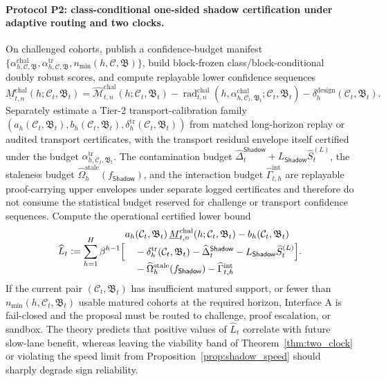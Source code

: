 \documentclass[11pt]{article}
\theoremstyle{definition}
\newcommand{\1}{\mathbf{1}}
\newcommand{\Defeq}{\vcentcolon=}
\newcommand{\Shadow}{\mathsf{Shadow}}
\begin{document}
\paragraph{Protocol P2: class-conditional one-sided shadow certification under adaptive routing and two clocks.} On challenged cohorts, publish a confidence-budget manifest $\{\alpha_{h,\mathcal C,\mathfrak B}^{\mathrm{chal}},\alpha_{h,\mathcal C,\mathfrak B}^{\mathrm{tr}},n_{\min}(h,\mathcal C,\mathfrak B)\}$, build block-frozen class/block-conditional doubly robust scores, and compute replayable lower confidence sequences
\[
\underline M^{\mathrm{chal}}_{t,n}(h;\mathcal C_t,\mathfrak B_t)
=
\widehat{\mathcal M}_{t,n}^{\mathrm{chal}}(h;\mathcal C_t,\mathfrak B_t)
-\operatorname{rad}_{t,n}^{\mathrm{chal}}(h,\alpha_{h,\mathcal C_t,\mathfrak B_t}^{\mathrm{chal}};\mathcal C_t,\mathfrak B_t)
-\delta_h^{\mathrm{design}}(\mathcal C_t,\mathfrak B_t).
\]
Separately estimate a Tier-2 transport-calibration family $(a_h(\mathcal C_t,\mathfrak B_t),b_h(\mathcal C_t,\mathfrak B_t),\delta_h^{\mathrm{tr}}(\mathcal C_t,\mathfrak B_t))$ from matched long-horizon replay or audited transport certificates, with the transport residual envelope itself certified under the budget $\alpha_{h,\mathcal C_t,\mathfrak B_t}^{\mathrm{tr}}$. The contamination budget $\widehat\Delta_t^{\Shadow}+L_{\Shadow}\widehat S_t^{(L)}$, the staleness budget $\widehat\Omega_h^{\mathrm{stale}}(f_{\Shadow})$, and the interaction budget $\widehat\Gamma_{t,h}^{\mathrm{int}}$ are replayable proof-carrying upper envelopes under separate logged certificates and therefore do not consume the statistical budget reserved for challenge or transport confidence sequences. Compute the operational certified lower bound
\[
\widehat L_t
\Defeq
\sum_{h=1}^{H}\beta^{h-1}\Bigl[
\begin{aligned}
& a_h(\mathcal C_t,\mathfrak B_t)\,\underline M^{\mathrm{chal}}_{t,n}(h;\mathcal C_t,\mathfrak B_t)
-b_h(\mathcal C_t,\mathfrak B_t)\\
&\quad -\delta_h^{\mathrm{tr}}(\mathcal C_t,\mathfrak B_t)
-\widehat\Delta_t^{\Shadow}
-L_{\Shadow}\widehat S_t^{(L)}\\
&\quad -\widehat\Omega_h^{\mathrm{stale}}(f_{\Shadow})
-\widehat\Gamma_{t,h}^{\mathrm{int}}
\end{aligned}
\Bigr].
\]
If the current pair $(\mathcal C_t,\mathfrak B_t)$ has insufficient matured support, or fewer than $n_{\min}(h,\mathcal C_t,\mathfrak B_t)$ usable matured cohorts at the required horizon, Interface A is fail-closed and the proposal must be routed to challenge, proof escalation, or sandbox. The theory predicts that positive values of $\widehat L_t$ correlate with future slow-lane benefit, whereas leaving the viability band of Theorem~\ref{thm:two_clock} or violating the speed limit from Proposition~\ref{prop:shadow_speed} should sharply degrade sign reliability.
\end{document}
